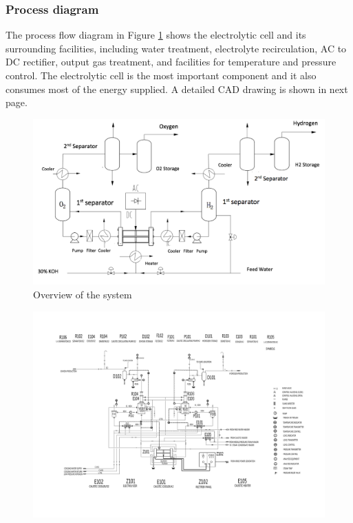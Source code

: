 \subsubsection{Process diagram} 
The process flow diagram in Figure \ref{fig:overview} shows the electrolytic cell and its surrounding facilities, including water treatment, electrolyte recirculation, AC to DC rectifier, output gas treatment, and facilities for temperature and pressure control. The electrolytic cell is the most important component and it also consumes most of the energy supplied. A detailed CAD drawing is shown in next page.

\begin{figure}[H]
\centering
\includegraphics[width= 9 cm] {overview.png} 
\caption{Overview of the system} \label{fig:overview}
\end{figure}  


\begin{figure}[H]
\centering
\includegraphics[width= 25 cm, angle=90] {cadcad.pdf}
\end{figure}

%


